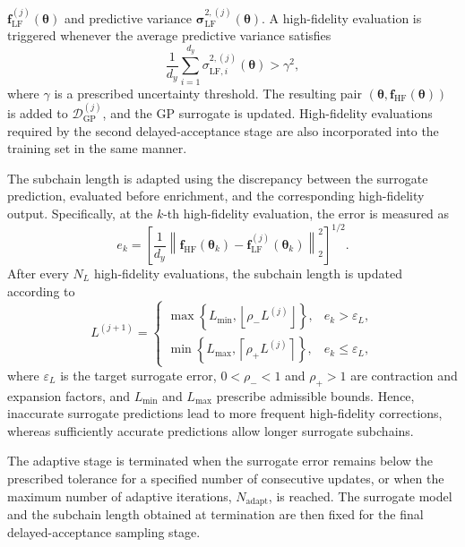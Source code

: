 \documentclass{elsarticle}
\begin{document}
$\mathbf{f}_{\mathrm{LF}}^{(j)}(\boldsymbol{\theta})$ and predictive variance
$\boldsymbol{\sigma}_{\mathrm{LF}}^{2,(j)}(\boldsymbol{\theta})$. A high-fidelity evaluation is triggered whenever the average predictive variance satisfies
\begin{equation}
    \frac{1}{d_y}
    \sum_{i=1}^{d_y}
    \sigma_{\mathrm{LF},i}^{2,(j)}(\boldsymbol{\theta})
    >
    \gamma^2,
\end{equation}
where $\gamma$ is a prescribed uncertainty threshold. The resulting pair
$(\boldsymbol{\theta},\mathbf{f}_{\mathrm{HF}}(\boldsymbol{\theta}))$
is added to $\mathcal{D}_{\mathrm{GP}}^{(j)}$, and the GP surrogate is updated. High-fidelity evaluations required by the second delayed-acceptance stage are also incorporated into the training set in the same manner.

The subchain length is adapted using the discrepancy between the surrogate prediction, evaluated before enrichment, and the corresponding high-fidelity output. Specifically, at the $k$-th high-fidelity evaluation, the error is measured as
\begin{equation}
    e_k
    =
    \left[
    \frac{1}{d_y}
    \left\|
    \mathbf{f}_{\mathrm{HF}}(\boldsymbol{\theta}_k)
    -
    \mathbf{f}_{\mathrm{LF}}^{(j)}(\boldsymbol{\theta}_k)
    \right\|_2^2
    \right]^{1/2}.
\end{equation}
After every $N_L$ high-fidelity evaluations, the subchain length is updated according to
\begin{equation}
    L^{(j+1)}
    =
    \begin{cases}
        \max\!\left\{L_{\min},
        \left\lfloor \rho_- L^{(j)}\right\rfloor\right\},
        & e_k>\varepsilon_L, \\[1mm]
        \min\!\left\{L_{\max},
        \left\lceil \rho_+ L^{(j)}\right\rceil\right\},
        & e_k\leq\varepsilon_L,
    \end{cases}
\end{equation}
where $\varepsilon_L$ is the target surrogate error,
$0<\rho_-<1$ and $\rho_+>1$ are contraction and expansion factors, and
$L_{\min}$ and $L_{\max}$ prescribe admissible bounds. Hence, inaccurate surrogate predictions lead to more frequent high-fidelity corrections, whereas sufficiently accurate predictions allow longer surrogate subchains.

The adaptive stage is terminated when the surrogate error remains below the prescribed tolerance for a specified number of consecutive updates, or when the maximum number of adaptive iterations, $N_{\mathrm{adapt}}$, is reached. The surrogate model and the subchain length obtained at termination are then fixed for the final delayed-acceptance sampling stage.
\end{document}
